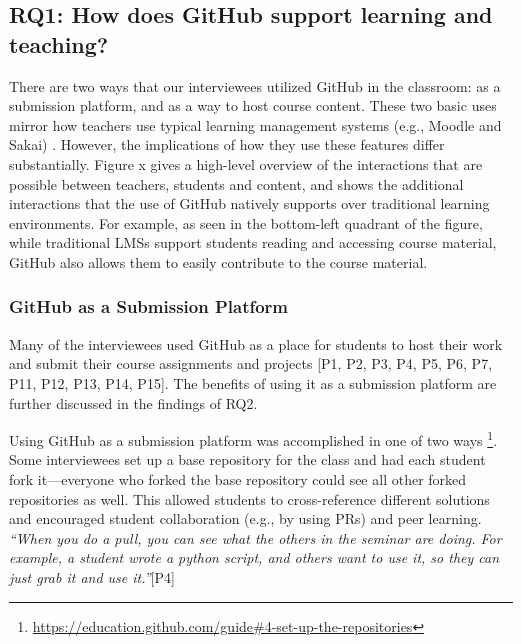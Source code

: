 \subsection{RQ1: How does GitHub support learning and teaching?}
There are two ways that our interviewees utilized GitHub in the classroom: as a submission platform, and as a way to host course content. These two basic uses mirror how teachers use typical learning management systems (e.g., Moodle and Sakai) \cite{malikowski2007model}. However, the implications of how they use these features differ substantially. Figure x gives a high-level overview of the interactions that are possible between teachers, students and content, and shows the additional interactions that the use of GitHub natively supports over traditional learning environments. For example, as seen in the bottom-left quadrant of the figure, while traditional LMSs support students reading and accessing course material, GitHub also allows them to easily contribute to the course material.


\subsubsection{GitHub as a Submission Platform}
Many of the interviewees used GitHub as a place for students to host their work and submit their course assignments and projects [P1, P2, P3, P4, P5, P6, P7, P11, P12, P13, P14, P15]. The benefits of using it as a submission platform are further discussed in the findings of RQ2.

Using GitHub as a submission platform was accomplished in one of two ways \footnote{\url{https://education.github.com/guide\#4-set-up-the-repositories}}. Some interviewees set up a base repository for the class and had each student fork it---everyone who forked the base repository could see all other forked repositories as well. This allowed students to cross-reference different solutions and encouraged student collaboration (e.g., by using PRs) and peer learning. \textit{``When you do a pull, you can see what the others in the seminar are doing. For example, a student wrote a python script, and others want to use it, so they can just grab it and use it.''}[P4]

